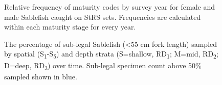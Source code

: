 \documentclass[12pt]{article}\usepackage[]{graphicx}\usepackage[]{color}
\begin{document}
\begin{figure}[htb]

{\centering {} 

}

\caption{Relative frequency of maturity codes by survey year for female and male Sablefish caught on StRS sets. Frequencies are calculated within each maturity stage for every year.}\label{fig:figure14}
\end{figure}

\begin{figure}[htb]

{\centering {} 

}

\caption{The percentage of sub-legal Sablefish (\textless55 cm fork length) sampled by spatial (S\textsubscript{1}-S\textsubscript{5}) and depth strata (S=shallow, RD\textsubscript{1}; M=mid, RD\textsubscript{2}; D=deep, RD\textsubscript{3}) over time. Sub-legal specimen count above 50\% sampled shown in blue.}\label{fig:figure15}
\end{figure}
\clearpage
\end{document}
